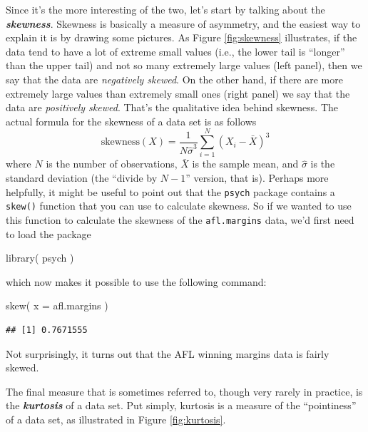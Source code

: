 \documentclass[
]{book}
\newenvironment{Shaded}{\begin{snugshade}}{\end{snugshade}}
\newcommand{\AttributeTok}[1]{\textcolor[rgb]{0.77,0.63,0.00}{#1}}
\newcommand{\FunctionTok}[1]{\textcolor[rgb]{0.00,0.00,0.00}{#1}}
\newcommand{\NormalTok}[1]{#1}
\begin{document}
Since it's the more interesting of the two, let's start by talking about the \textbf{\emph{skewness}}. Skewness is basically a measure of asymmetry, and the easiest way to explain it is by drawing some pictures. As Figure \ref{fig:skewness} illustrates, if the data tend to have a lot of extreme small values (i.e., the lower tail is ``longer'' than the upper tail) and not so many extremely large values (left panel), then we say that the data are \emph{negatively skewed}. On the other hand, if there are more extremely large values than extremely small ones (right panel) we say that the data are \emph{positively skewed}. That's the qualitative idea behind skewness. The actual formula for the skewness of a data set is as follows
\[
\mbox{skewness}(X) = \frac{1}{N \hat{\sigma}^3} \sum_{i=1}^N (X_i - \bar{X})^3
\]
where \(N\) is the number of observations, \(\bar{X}\) is the sample mean, and \(\hat{\sigma}\) is the standard deviation (the ``divide by \(N-1\)'' version, that is). Perhaps more helpfully, it might be useful to point out that the \texttt{psych} package contains a \texttt{skew()} function that you can use to calculate skewness. So if we wanted to use this function to calculate the skewness of the \texttt{afl.margins} data, we'd first need to load the package

\begin{Shaded}
\begin{Highlighting}[]
\FunctionTok{library}\NormalTok{( psych )}
\end{Highlighting}
\end{Shaded}

which now makes it possible to use the following command:

\begin{Shaded}
\begin{Highlighting}[]
\FunctionTok{skew}\NormalTok{( }\AttributeTok{x =}\NormalTok{ afl.margins )}
\end{Highlighting}
\end{Shaded}

\begin{verbatim}
## [1] 0.7671555
\end{verbatim}

Not surprisingly, it turns out that the AFL winning margins data is fairly skewed.

The final measure that is sometimes referred to, though very rarely in practice, is the \textbf{\emph{kurtosis}} of a data set. Put simply, kurtosis is a measure of the ``pointiness'' of a data set, as illustrated in Figure \ref{fig:kurtosis}.
\end{document}
